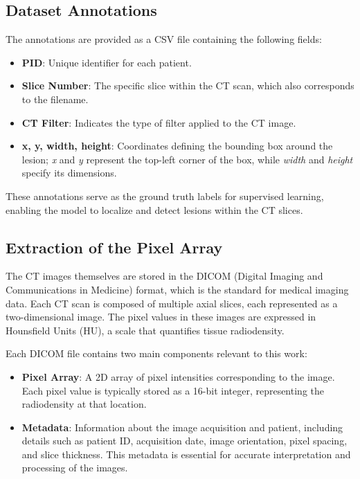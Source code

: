 \subsection*{Dataset Annotations}
The annotations are provided as a CSV file containing the following fields:
\begin{itemize}
\item \textbf{PID}: Unique identifier for each patient.
\item \textbf{Slice Number}: The specific slice within the CT scan, which also corresponds to the filename.
\item \textbf{CT Filter}: Indicates the type of filter applied to the CT image.
\item \textbf{x, y, width, height}: Coordinates defining the bounding box around the lesion; \textit{x} and \textit{y} represent the top-left corner of the box, while \textit{width} and \textit{height} specify its dimensions.
\end{itemize}

These annotations serve as the ground truth labels for supervised learning, enabling the model to localize and detect lesions within the CT slices.

\subsection*{Extraction of the Pixel Array}
The CT images themselves are stored in the DICOM (Digital Imaging and Communications in Medicine) format, which is the standard for medical imaging data. Each CT scan is composed of multiple axial slices, each represented as a two-dimensional image. The pixel values in these images are expressed in Hounsfield Units (HU), a scale that quantifies tissue radiodensity.

Each DICOM file contains two main components relevant to this work:
\begin{itemize}
\item \textbf{Pixel Array}: A 2D array of pixel intensities corresponding to the image. Each pixel value is typically stored as a 16-bit integer, representing the radiodensity at that location.
\item \textbf{Metadata}: Information about the image acquisition and patient, including details such as patient ID, acquisition date, image orientation, pixel spacing, and slice thickness. This metadata is essential for accurate interpretation and processing of the images.
\end{itemize}

